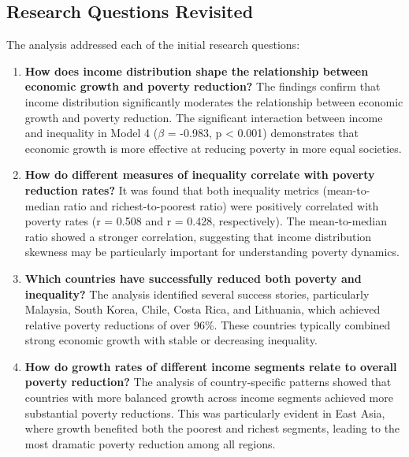 \documentclass[12pt,a4paper]{article}
\begin{document}
\subsection{Research Questions Revisited}
The analysis addressed each of the initial research questions:
\begin{enumerate}
    \item \textbf{How does income distribution shape the relationship between economic growth and poverty reduction?} The findings confirm that income distribution significantly moderates the relationship between economic growth and poverty reduction. The significant interaction between income and inequality in Model 4 ($\beta$ = -0.983, p < 0.001) demonstrates that economic growth is more effective at reducing poverty in more equal societies.
    \item \textbf{How do different measures of inequality correlate with poverty reduction rates?} It was found that both inequality metrics (mean-to-median ratio and richest-to-poorest ratio) were positively correlated with poverty rates (r = 0.508 and r = 0.428, respectively). The mean-to-median ratio showed a stronger correlation, suggesting that income distribution skewness may be particularly important for understanding poverty dynamics.
    \item \textbf{Which countries have successfully reduced both poverty and inequality?} The analysis identified several success stories, particularly Malaysia, South Korea, Chile, Costa Rica, and Lithuania, which achieved relative poverty reductions of over 96\%. These countries typically combined strong economic growth with stable or decreasing inequality.
    \item \textbf{How do growth rates of different income segments relate to overall poverty reduction?} The analysis of country-specific patterns showed that countries with more balanced growth across income segments achieved more substantial poverty reductions. This was particularly evident in East Asia, where growth benefited both the poorest and richest segments, leading to the most dramatic poverty reduction among all regions.
\end{enumerate}
\end{document}
